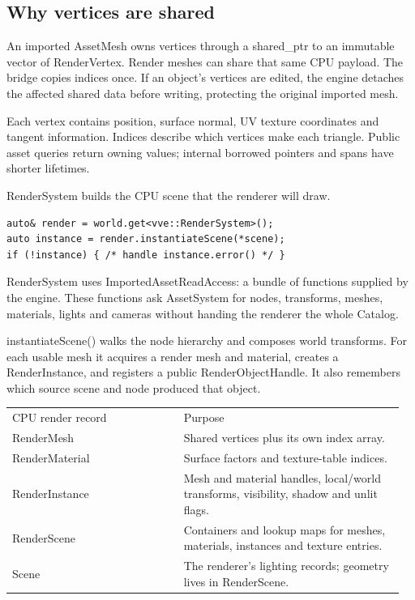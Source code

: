 \documentclass[11pt,a4paper]{article}
\begin{document}
\subsection*{Why vertices are shared}
An imported AssetMesh owns vertices through a shared\_ptr to an immutable vector of RenderVertex. Render meshes can share that same CPU payload. The bridge copies indices once. If an object's vertices are edited, the engine detaches the affected shared data before writing, protecting the original imported mesh.

Each vertex contains position, surface normal, UV texture coordinates and tangent information. Indices describe which vertices make each triangle. Public asset queries return owning values; internal borrowed pointers and spans have shorter lifetimes.

\label{core-31}
RenderSystem builds the CPU scene that the renderer will draw.

\begin{lstlisting}[language={}]
auto& render = world.get<vve::RenderSystem>();
auto instance = render.instantiateScene(*scene);
if (!instance) { /* handle instance.error() */ }
\end{lstlisting}

RenderSystem uses ImportedAssetReadAccess: a bundle of functions supplied by the engine. These functions ask AssetSystem for nodes, transforms, meshes, materials, lights and cameras without handing the renderer the whole Catalog.

instantiateScene() walks the node hierarchy and composes world transforms. For each usable mesh it acquires a render mesh and material, creates a RenderInstance, and registers a public RenderObjectHandle. It also remembers which source scene and node produced that object.

{\small
\begin{longtable}{@{}p{0.42\linewidth}p{0.54\linewidth}@{}}
CPU render record & Purpose \\
RenderMesh & Shared vertices plus its own index array. \\
RenderMaterial & Surface factors and texture-table indices. \\
RenderInstance & Mesh and material handles, local/world transforms, visibility, shadow and unlit flags. \\
RenderScene & Containers and lookup maps for meshes, materials, instances and texture entries. \\
Scene & The renderer's lighting records; geometry lives in RenderScene. \\
\end{longtable}
}
\end{document}
